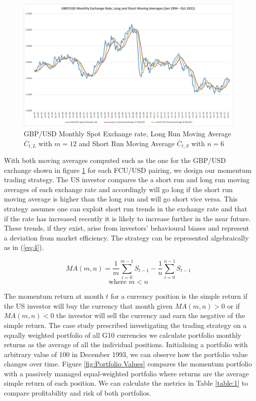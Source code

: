 \documentclass{article}
\begin{document}
\begin{figure}[h!]
    \centering
    \includegraphics[width=0.75\linewidth]{GBP_USD Rates.png}
    \captionsetup{font=small, width = 0.75\linewidth}
    \caption{\centering GBP/USD Monthly Spot Exchange rate, Long Run Moving Average $\overline{C}_{t,L}$ with $m = 12$  and Short Run Moving Average $\overline{C}_{t,S} $ with $ n = 6$}
    \label{fig:GBP/USD}
\end{figure}

With both moving averages computed such as the one for the GBP/USD exchange shown in figure \ref{fig:GBP/USD} for each FCU/USD pairing, we design our momentum trading strategy. The US investor compares the a short run and long run moving averages of each exchange rate and accordingly will go long if the short run moving average is higher than the long run and will go short vice versa. This strategy assumes one can exploit short run trends in the exchange rate and that if the rate has increased recently it is likely to increase further in the near future. These trends, if they exist, arise from investors’ behavioural biases and represent a deviation from market efficiency. The strategy can be represented algebraically as in (\ref{eq:4}).

\begin{equation}\label{eq:4}
MA(m,n) = \frac{1}{m}\sum_{i=0}^{m-1} S_{t-1} - \frac{1}{n}\sum_{i=0}^{n-1} S_{t-1}
\end{equation}
\[
\text{where  } m < n
\]

The momentum return at month $t$ for a currency position is the simple return if the US investor will buy the currency that month given $MA(m,n)>0$ or if $MA(m,n) < 0$ the investor will sell the currency and earn the negative of the simple return. The case study prescribed investigating the trading strategy on a equally weighted portfolio of all G10 currencies we calculate portfolio monthly returns as the average of all the individual positions. Initialising a portfolio with arbitrary value of 100 in December 1993, we can observe how the portfolio value changes over time. Figure \ref{fig:Portfolio Values} compares the momentum portfolio with a passively managed equal-weighted portfolio where returns are the average simple return of each position. We can calculate the metrics in Table \ref{table:1} to compare profitability and risk of both portfolios. 
\end{document}
